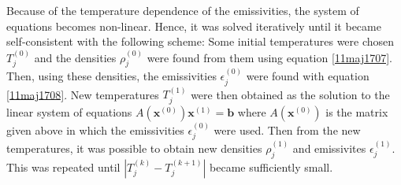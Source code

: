 \documentclass[twocolumn]{article}
\begin{document}
\begin{large}
Because of the temperature dependence of the emissivities, the system of equations becomes non-linear. Hence, it was solved iteratively until it became self-consistent with the following scheme: Some initial temperatures were chosen $T_j^{(0)}$ and the densities $\rho_j^{(0)}$ were found from them using equation \eqref{11maj1707}. Then, using these densities, the emissivities $\epsilon_j^{(0)}$ were found with equation \eqref{11maj1708}. New temperatures $T_j^{(1)}$ were then obtained as the solution to the linear system of equations $A(\mathbf{x}^{(0)})\mathbf{x}^{(1)} = \mathbf{b}$ where $A(\mathbf{x}^{(0)})$ is the matrix given above in which the emissivities $\epsilon_j^{(0)}$ were used. Then from the new temperatures, it was possible to obtain new densities $\rho_j^{(1)}$ and emissivites $\epsilon_j^{(1)}$. This was repeated until $|T_j^{(k)} -  T_{j}^{(k+1)}|$ became sufficiently small.


\end{large}
\end{document}
